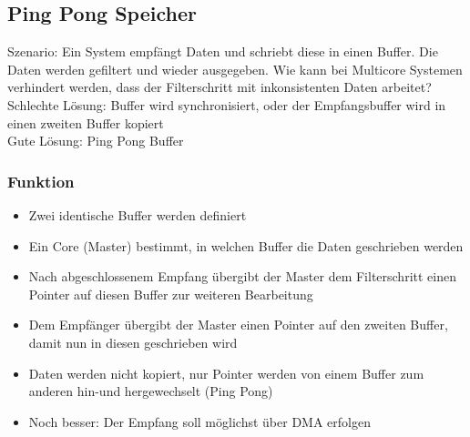 \subsection{Ping Pong Speicher}
Szenario: Ein System empfängt Daten und schriebt diese in einen Buffer. Die Daten werden gefiltert und wieder ausgegeben. Wie kann bei Multicore Systemen verhindert werden, dass der Filterschritt mit inkonsistenten Daten arbeitet? \\
Schlechte Lösung: Buffer wird synchronisiert, oder der Empfangsbuffer wird in einen zweiten Buffer kopiert \\
Gute Lösung: Ping Pong Buffer

\subsubsection{Funktion}
\begin{itemize}
	\item Zwei identische Buffer werden definiert
	\item Ein Core (Master) bestimmt, in welchen Buffer die Daten geschrieben werden
	\item Nach abgeschlossenem Empfang übergibt der Master dem Filterschritt einen Pointer auf diesen Buffer zur weiteren Bearbeitung
	\item Dem Empfänger übergibt der Master einen Pointer auf den zweiten Buffer, damit nun in diesen geschrieben wird
	\item Daten werden nicht kopiert, nur Pointer werden von einem Buffer zum anderen hin-und hergewechselt (Ping Pong)
	\item Noch besser: Der Empfang soll möglichst über DMA erfolgen
\end{itemize}
